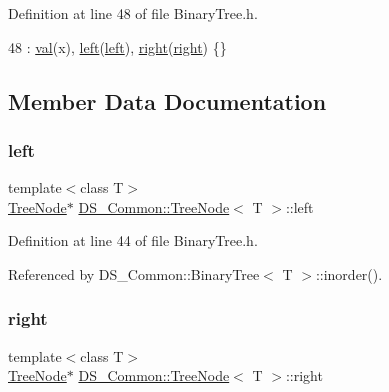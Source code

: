 Definition at line 48 of file Binary\+Tree.\+h.


\begin{DoxyCode}
48 : \mbox{\hyperlink{struct_d_s___common_1_1_tree_node_a24807010f9e48c1a829c05e6384b199e}{val}}(x), \mbox{\hyperlink{struct_d_s___common_1_1_tree_node_ae2579ab4d93c06c49a5ddaa4097cc55d}{left}}(\mbox{\hyperlink{struct_d_s___common_1_1_tree_node_ae2579ab4d93c06c49a5ddaa4097cc55d}{left}}), \mbox{\hyperlink{struct_d_s___common_1_1_tree_node_a55f75143e837cd009739ab32f49c93e6}{right}}(\mbox{\hyperlink{struct_d_s___common_1_1_tree_node_a55f75143e837cd009739ab32f49c93e6}{right}}) \{\}
\end{DoxyCode}


\subsection{Member Data Documentation}
\mbox{\label{struct_d_s___common_1_1_tree_node_ae2579ab4d93c06c49a5ddaa4097cc55d}} 
\subsubsection{\texorpdfstring{left}{left}}
{\footnotesize\ttfamily template$<$class T$>$ \\
\mbox{\hyperlink{struct_d_s___common_1_1_tree_node}{Tree\+Node}}$\ast$ \mbox{\hyperlink{struct_d_s___common_1_1_tree_node}{D\+S\+\_\+\+Common\+::\+Tree\+Node}}$<$ T $>$\+::left}



Definition at line 44 of file Binary\+Tree.\+h.



Referenced by D\+S\+\_\+\+Common\+::\+Binary\+Tree$<$ T $>$\+::inorder().

\mbox{\label{struct_d_s___common_1_1_tree_node_a55f75143e837cd009739ab32f49c93e6}} 
\subsubsection{\texorpdfstring{right}{right}}
{\footnotesize\ttfamily template$<$class T$>$ \\
\mbox{\hyperlink{struct_d_s___common_1_1_tree_node}{Tree\+Node}}$\ast$ \mbox{\hyperlink{struct_d_s___common_1_1_tree_node}{D\+S\+\_\+\+Common\+::\+Tree\+Node}}$<$ T $>$\+::right}



